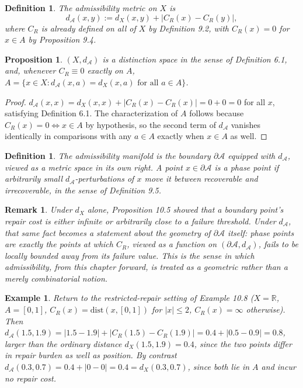 \documentclass[11pt]{book}
\newtheorem{definition}[theorem]{Definition}
\newtheorem{proposition}[theorem]{Proposition}
\newtheorem{remark}[theorem]{Remark}
\newtheorem{example}[theorem]{Example}
\begin{document}
\begin{definition}
The \emph{admissibility metric} on $X$ is
\[
d_{\mathcal A}(x,y) := d_X(x,y) + \big| C_R(x) - C_R(y) \big|,
\]
where $C_R$ is already defined on all of $X$ by Definition 9.2, with $C_R(x) = 0$ for $x \in A$ by Proposition 9.4.
\end{definition}

\begin{proposition}
$(X, d_{\mathcal A})$ is a distinction space in the sense of Definition 6.1, and, whenever $C_R \equiv 0$ exactly on $A$, $A = \{x \in X : d_{\mathcal A}(x, a) = d_X(x,a) \text{ for all } a \in A\}$.
\end{proposition}

\begin{proof}
$d_{\mathcal A}(x,x) = d_X(x,x) + |C_R(x) - C_R(x)| = 0 + 0 = 0$ for all $x$, satisfying Definition 6.1. The characterization of $A$ follows because $C_R(x) = 0 \iff x \in A$ by hypothesis, so the second term of $d_{\mathcal A}$ vanishes identically in comparisons with any $a \in A$ exactly when $x \in A$ as well.
\end{proof}

\begin{definition}
The \emph{admissibility manifold} is the boundary $\partial \mathcal A$ equipped with $d_{\mathcal A}$, viewed as a metric space in its own right. A point $x \in \partial \mathcal A$ is a \emph{phase point} if arbitrarily small $d_{\mathcal A}$-perturbations of $x$ move it between recoverable and irrecoverable, in the sense of Definition 9.5.
\end{definition}

\begin{remark}
Under $d_X$ alone, Proposition 10.5 showed that a boundary point's repair cost is either infinite or arbitrarily close to a failure threshold. Under $d_{\mathcal A}$, that same fact becomes a statement about the geometry of $\partial \mathcal A$ itself: phase points are exactly the points at which $C_R$, viewed as a function on $(\partial \mathcal A, d_{\mathcal A})$, fails to be locally bounded away from its failure value. This is the sense in which admissibility, from this chapter forward, is treated as a geometric rather than a merely combinatorial notion.
\end{remark}

\begin{example}
Return to the restricted-repair setting of Example 10.8 ($X=\mathbb R$, $A=[0,1]$, $C_R(x) = \mathrm{dist}(x,[0,1])$ for $|x|\leq2$, $C_R(x)=\infty$ otherwise). Then $d_{\mathcal A}(1.5,1.9) = |1.5-1.9| + |C_R(1.5)-C_R(1.9)| = 0.4 + |0.5-0.9| = 0.8$, larger than the ordinary distance $d_X(1.5,1.9)=0.4$, since the two points differ in repair burden as well as position. By contrast $d_{\mathcal A}(0.3,0.7) = 0.4 + |0-0| = 0.4 = d_X(0.3,0.7)$, since both lie in $A$ and incur no repair cost.
\end{example}
\end{document}
